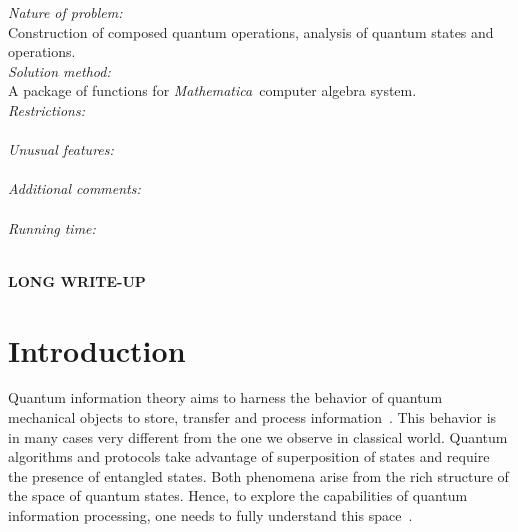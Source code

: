 \documentclass{elsart}
\newcommand{\Mathematica}{\emph{Mathematica}}
\newcommand{\1}{{\rm 1\hspace{-0.9mm}l}}
\begin{document}
\begin{small}
{\em Nature of problem:}\\
  Construction of composed quantum operations, analysis of quantum states and
  operations.
   \\
{\em Solution method:}\\
  A package of functions for \Mathematica\ computer algebra system.
   \\
{\em Restrictions:}\\
   \\
{\em Unusual features:}\\
   \\
{\em Additional comments:}\\
   \\
{\em Running time:}\\
   \\

\end{small}

\newpage


\hspace{1pc}
{\bf LONG WRITE-UP}




\section{Introduction}\label{sec:intro}
Quantum information theory aims to harness the behavior of quantum mechanical
objects to store, transfer and process information~\cite{hayashi}. This behavior
is in many cases very different from the one we observe in classical world.
Quantum algorithms and protocols take advantage of superposition of states and
require the presence of entangled states. Both phenomena arise from the rich
structure of the space of quantum states. Hence, to explore the capabilities of
quantum information processing, one needs to fully understand this
space~\cite{BZ06}. 
\end{document}
